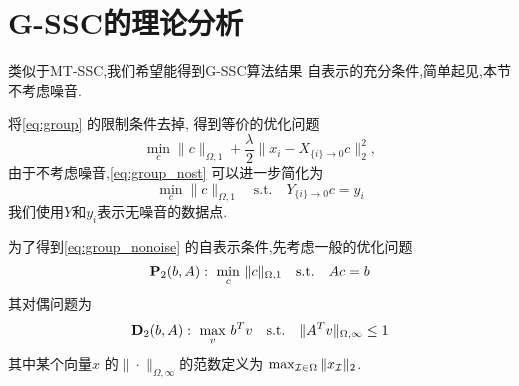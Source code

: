\section{G-SSC的理论分析}\label{sec:proof_group}
类似于MT-SSC,我们希望能得到G-SSC算法结果
自表示的充分条件,简单起见,本节不考虑噪音.

将\eqref{eq:group} 的限制条件去掉, 得到等价的优化问题
\begin{equation} \label{eq:group_nost}
  \min_{c} \|c\|_{\Omega,1}+\frac{\lambda}{2} \|x_i-X_{\{i\}\rightarrow
0}c\|_2^2,
\end{equation}
由于不考虑噪音,\eqref{eq:group_nost} 可以进一步简化为
\begin{equation} \label{eq:group_nonoise}
    \min_{c} \|c\|_{\Omega,1} \quad\text{s.t.}\quad
    Y_{\{i\}\rightarrow 0} c=y_i
\end{equation}
我们使用$Y$和$y_i$表示无噪音的数据点.

为了得到\eqref{eq:group_nonoise} 的自表示条件,先考虑一般的优化问题
\[
  \mathbf{P}_2(b,A): \,\, \min_c\, \| c\|_{\Omega,1} \quad \text{s.t.}\quad Ac = b
\]
其对偶问题为 
\[
  \mathbf{D}_2(b,A): \,\, \max_{v}\, b^T v \quad
  \text{s.t.}\quad \|A^Tv\|_{\Omega,\infty} \leq 1
\]
其中某个向量$x$ 的$\|\cdot\|_{\Omega, \infty}$的范数定义为
$\max_{\mathcal{I} \in \Omega} \|x_{\mathcal{I}}\|_2$.

